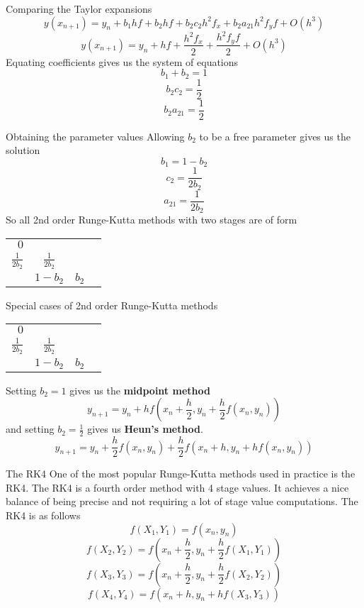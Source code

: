 \documentclass[12pt]{beamer}
\begin{document}
\begin{frame}{Comparing the Taylor expansions}
  $$y(x_{n+1}) = y_n + b_1hf + b_2hf + b_2c_2h^2f_x + b_2a_{21}h^2f_yf + O(h^3)$$
  $$y(x_{n+1}) = y_n + hf + \frac{h^2f_x}{2} + \frac{h^2f_yf}{2} + O(h^3)$$
  \pause
  Equating coefficients gives us the system of equations
  $$b_1 + b_2 = 1$$
  $$b_2c_2 = \frac{1}{2}$$
  $$b_2a_{21} = \frac{1}{2}$$
\end{frame}

\begin{frame}{Obtaining the parameter values}
  Allowing $b_2$ to be a free parameter gives us the solution
  $$b_1 = 1 - b_2$$
  $$c_2 = \frac{1}{2b_2}$$
  $$a_{21} = \frac{1}{2b_2}$$
  \pause
  So all 2nd order Runge-Kutta methods with two stages are of form
  \begin{table}
  \centering
  \renewcommand{\arraystretch}{1.25}
     \begin{tabular}{r | c*{2}{c}}
                        $0$ \\
                    $\frac{1}{2b_2}$ & $\frac{1}{2b_2}$ \\
                     \hline
    \phantom{c4}     & $1 - b_2$ & $b_2$
    \end{tabular}
  \renewcommand{\arraystretch}{1.0}
  \end{table}
\end{frame}

\begin{frame}{Special cases of 2nd order Runge-Kutta methods}
  \begin{table}
  \centering
  \renewcommand{\arraystretch}{1.25}
     \begin{tabular}{r | c*{2}{c}}
                        $0$ \\
                    $\frac{1}{2b_2}$ & $\frac{1}{2b_2}$ \\
                     \hline
    \phantom{c4}     & $1 - b_2$ & $b_2$
    \end{tabular}
  \renewcommand{\arraystretch}{1.0}
  \end{table}
  \pause
  Setting $b_2 = 1$ gives us the \textbf{midpoint method}
  $$y_{n+1} = y_n + hf(x_n + \frac{h}{2}, y_n + \frac{h}{2}f(x_n,y_n))$$
  \pause
  and setting $b_2 = \frac{1}{2}$ gives us \textbf{Heun's method}.
  $$y_{n+1} = y_n + \frac{h}{2}f(x_n,y_n) + \frac{h}{2}f(x_n + h, y_n + hf(x_n,y_n))$$
\end{frame}

\begin{frame}{The RK4}
  One of the most popular Runge-Kutta methods used in practice is the RK4.
  The RK4 is a fourth order method with 4 stage values. It achieves a nice balance
  of being precise and not requiring a lot of stage value computations. \newline
  \newline
  \pause
  The RK4 is as follows
  \pause
  $$f(X_1,Y_1) = f(x_n,y_n)$$
  $$f(X_2,Y_2) = f(x_n + \frac{h}{2}, y_n + \frac{h}{2}f(X_1,Y_1))$$
  $$f(X_3,Y_3) = f(x_n + \frac{h}{2}, y_n + \frac{h}{2}f(X_2,Y_2))$$
  $$f(X_4,Y_4) = f(x_n + h, y_n + hf(X_3,Y_3))$$
\end{frame}
\end{document}
